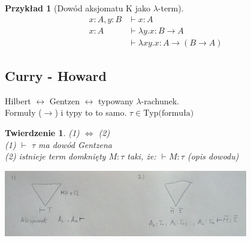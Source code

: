 \documentclass[10pt,a4paper]{article}
\theoremstyle{plain}
\newtheorem{theorem}{Twierdzenie}
\theoremstyle{definition}
\newtheorem*{example}{Przykład}
\newcommand{\impl}{\rightarrow}
\begin{document}
\begin{example}[Dowód aksjomatu K jako $\lambda$-term]
\begin{align*}
x:A, y:B &\vdash x:A \\
x:A &\vdash \lambda y . x : B \impl A \\
&\vdash \lambda xy . x : A \impl (B \impl A)
\end{align*}
\end{example}


\subsection{Curry - Howard}

Hilbert $\leftrightarrow$ Gentzen $\leftrightarrow$ typowany $\lambda$-rachunek.\\
Formuły ($\rightarrow$) i typy to to samo. $\tau\in \text{Typ(formuła)}$

\begin{theorem}
(1) $\iff$ (2)\\
(1) $\vdash$ $\tau$ ma dowód Gentzena\\
(2) istnieje term domknięty $M:\tau$ taki, że: $\vdash M:\tau$ (opis dowodu)
\end{theorem}
\begin{center}
\includegraphics[width=0.8\textwidth]{img/typowaneWyprowadzenie}
\end{center}
\end{document}
